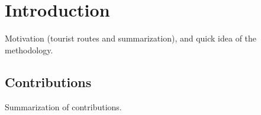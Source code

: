 \chapter{Introduction}
\label{sec:introduction}

Motivation (tourist routes and summarization), and quick idea of the methodology.

\section{Contributions}

Summarization of contributions.